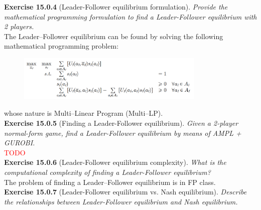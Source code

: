 \textbf{Exercise 15.0.4} (Leader-Follower equilibrium formulation). \textit{Provide the mathematical programming formulation to find a Leader-Follower equilibrium with 2 players.}\\

The Leader–Follower equilibrium can be found by solving the following mathematical programming problem:
\begin{figure}[H]
\centering
\includegraphics[width=0.8\textwidth]{images/img_3_15_04.png}
\end{figure}
whose nature is Multi–Linear Program (Multi–LP).\\

\textbf{Exercise 15.0.5} (Finding a Leader-Follower equilibrium). \textit{Given a 2-player normal-form game, find a Leader-Follower equilibrium by means of AMPL + GUROBI.}\\

\textcolor{red}{TODO}\\

\textbf{Exercise 15.0.6} (Leader-Follower equilibrium complexity). \textit{What is the computational complexity of finding a Leader-Follower equilibrium?}\\

The problem of finding a Leader–Follower equilibrium is in \textsf{FP} class.\\

\textbf{Exercise 15.0.7} (Leader-Follower equilibrium vs.  Nash equilibrium). \textit{Describe the relationships between Leader-Follower equilibrium and Nash equilibrium.}\\

